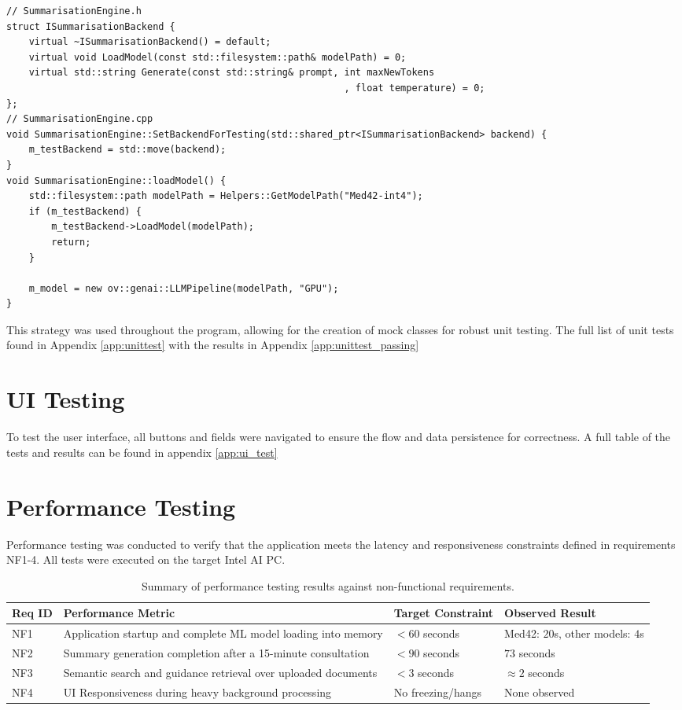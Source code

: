 \begin{verbatim}
// SummarisationEngine.h
struct ISummarisationBackend {
    virtual ~ISummarisationBackend() = default;
    virtual void LoadModel(const std::filesystem::path& modelPath) = 0;
    virtual std::string Generate(const std::string& prompt, int maxNewTokens
                                                            , float temperature) = 0;
};
// SummarisationEngine.cpp
void SummarisationEngine::SetBackendForTesting(std::shared_ptr<ISummarisationBackend> backend) {
    m_testBackend = std::move(backend);
}
void SummarisationEngine::loadModel() {
    std::filesystem::path modelPath = Helpers::GetModelPath("Med42-int4");
    if (m_testBackend) {
        m_testBackend->LoadModel(modelPath);
        return;
    }

    m_model = new ov::genai::LLMPipeline(modelPath, "GPU");
}

\end{verbatim}

This strategy was used throughout the program, allowing for the creation of mock classes for robust unit testing. The full list of unit tests found in Appendix \ref{app:unittest} with the results in Appendix \ref{app:unittest_passing}

\section{UI Testing}
To test the user interface, all buttons and fields were navigated to ensure the flow and data persistence for correctness. A full table of the tests and results can be found in appendix \ref{app:ui_test}

\section{Performance Testing}
Performance testing was conducted to verify that the application meets the latency and responsiveness constraints defined in requirements NF1-4. All tests were executed on the target Intel AI PC.

\begin{table}[H]
\centering
\begin{tabular}{|l|p{6cm}|l|l|}
\hline
\textbf{Req ID} & \textbf{Performance Metric} & \textbf{Target Constraint} & \textbf{Observed Result} \\ \hline
NF1 & Application startup and complete ML model loading into memory & $< 60$ seconds & Med42: $20$s, other models: $4$s \\ \hline
NF2 & Summary generation completion after a 15-minute consultation & $< 90$ seconds & $73$ seconds \\ \hline
NF3 & Semantic search and guidance retrieval over uploaded documents & $< 3$ seconds & $\approx 2$ seconds \\ \hline
NF4 & UI Responsiveness during heavy background processing & No freezing/hangs & None observed \\ \hline
\end{tabular}
\caption{Summary of performance testing results against non-functional requirements.}
\label{tab:performance_results}
\end{table}

